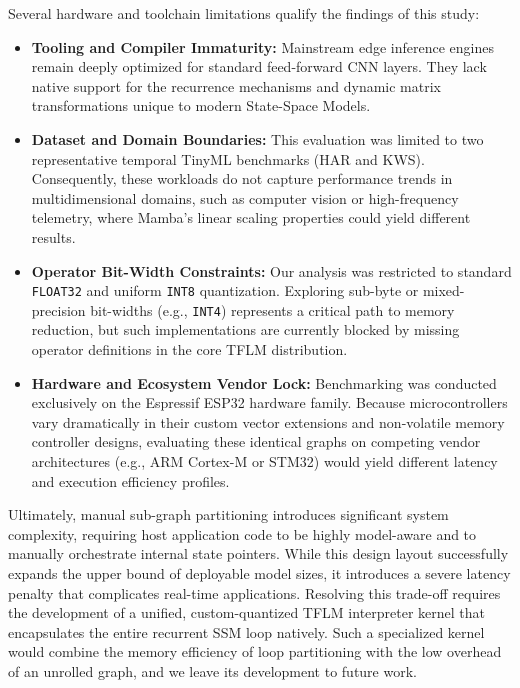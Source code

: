 Several hardware and toolchain limitations qualify the findings of this study:
\begin{itemize}
  \item \textbf{Tooling and Compiler Immaturity:} Mainstream edge inference engines remain deeply optimized for standard feed-forward CNN layers. They lack native support for the recurrence mechanisms and dynamic matrix transformations unique to modern State-Space Models.
  \item \textbf{Dataset and Domain Boundaries:} This evaluation was limited to two representative temporal TinyML benchmarks (HAR and KWS). Consequently, these workloads do not capture performance trends in multidimensional domains, such as computer vision or high-frequency telemetry, where Mamba's linear scaling properties could yield different results.
  \item \textbf{Operator Bit-Width Constraints:} Our analysis was restricted to standard \texttt{FLOAT32} and uniform \texttt{INT8} quantization. Exploring sub-byte or mixed-precision bit-widths (e.g., \texttt{INT4}) represents a critical path to memory reduction, but such implementations are currently blocked by missing operator definitions in the core TFLM distribution.
  \item \textbf{Hardware and Ecosystem Vendor Lock:} Benchmarking was conducted exclusively on the Espressif ESP32 hardware family. Because microcontrollers vary dramatically in their custom vector extensions and non-volatile memory controller designs, evaluating these identical graphs on competing vendor architectures (e.g., ARM Cortex-M or STM32) would yield different latency and execution efficiency profiles.
\end{itemize}

Ultimately, manual sub-graph partitioning introduces significant system complexity, requiring host application code to be highly model-aware and to manually orchestrate internal state pointers. While this design layout successfully expands the upper bound of deployable model sizes, it introduces a severe latency penalty that complicates real-time applications. Resolving this trade-off requires the development of a unified, custom-quantized TFLM interpreter kernel that encapsulates the entire recurrent SSM loop natively. Such a specialized kernel would combine the memory efficiency of loop partitioning with the low overhead of an unrolled graph, and we leave its development to future work.
